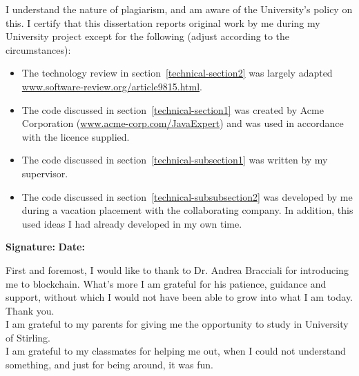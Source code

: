 \documentclass[a4paper,11pt]{report}
\begin{document}


I understand the nature of plagiarism, and am aware of the University's policy
on this. I certify that this dissertation reports original work by me during my
University project except for the following (adjust according to the
circumstances):

\begin{itemize}

  \item
  The technology review in section~\ref{technical-section2} was largely adapted
  \url{www.software-review.org/article9815.html}.

  \item
  The code discussed in section~\ref{technical-section1} was created by Acme
  Corporation (\url{www.acme-corp.com/JavaExpert}) and was used in accordance
  with the licence supplied.

  \item
  The code discussed in section~\ref{technical-subsection1} was written by my
  supervisor.

  \item
  The code discussed in section~\ref{technical-subsubsection2} was developed by
  me during a vacation placement with the collaborating company. In addition,
  this used ideas I had already developed in my own time.

\end{itemize}

\bigskip

{\bf Signature:} \hspace{20em} {\bf Date:}




First and foremost, I would like to thank to Dr. Andrea Bracciali for introducing me to blockchain. What's more I am grateful for his patience, guidance and support, without which I would not have been able to grow into what I am today. Thank you.
\\

I am grateful to my parents for giving me the opportunity to study in University of Stirling. 
\\

I am grateful to my classmates for helping me out, when I could not understand something, and just for being around, it was fun. 
\\
\end{document}
